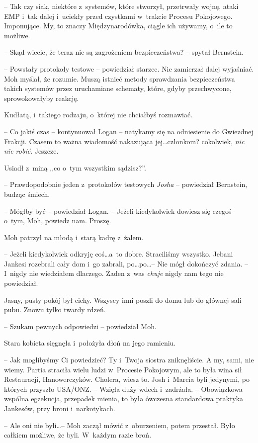 \documentclass[oneside,polish,11pt,sfheadings]{mwbk}
\begin{document}
-- Tak czy siak,
niektóre z~systemów, które stworzył, przetrwały wojnę, ataki EMP i~tak
dalej i~uciekły przed czystkami w~trakcie Procesu Pokojowego.
Imponujące. My, to znaczy Międzynarodówka, ciągle ich używamy, o~ile to
możliwe.

-- Skąd wiecie, że teraz nie są zagrożeniem bezpieczeństwa? -- spytał
Bernstein.

-- Powstały protokoły testowe -- powiedział starzec. Nie zamierzał dalej
wyjaśniać. Moh myślał, że rozumie. Muszą istnieć metody sprawdzania
bezpieczeństwa takich systemów przez uruchamiane schematy, które, gdyby
przechwycone, sprowokowałyby reakcję.

Kudłatą, i~takiego rodzaju, o~której nie chciałbyś rozmawiać.

-- Co jakiś czas -- kontynuował Logan -- natykamy się na odniesienie do
Gwiezdnej Frakcji. Czasem to ważna wiadomość nakazująca jej\ldots członkom?
cokolwiek, \emph{nic nie robić}. Jeszcze.

Usiadł z~miną ,,co o~tym wszystkim sądzisz?''.

-- Prawdopodobnie jeden z~protokołów testowych \emph{Josha} -- powiedział
Bernstein, budząc śmiech.

-- Mógłby być -- powiedział Logan. -- Jeżeli kiedykolwiek dowiesz się
czegoś o~tym, Moh, powiedz nam. Proszę.

Moh patrzył na młodą i~starą kadrę z~żalem. 

-- Jeżeli kiedykolwiek
odkryję coś\ldots a~to dobre. Straciliśmy wszystko. Jebani Jankesi
rozebrali cały dom i~go zabrali, po\ldots po\ldots -- Nie mógł dokończyć
zdania. -- I~nigdy nie wiedziałem dlaczego. Żaden z~was \emph{chuje}
nigdy nam tego nie powiedział.

Jasny, pusty pokój był cichy. Wszyscy inni poszli do domu lub do głównej
sali pubu. Znowu tylko twardy rdzeń.

-- Szukam pewnych odpowiedzi -- powiedział Moh.

Stara kobieta sięgnęła i~położyła dłoń na jego ramieniu. 

-- Jak
moglibyśmy Ci powiedzieć? Ty i~Twoja siostra zniknęliście. A my, sami,
nie wiemy. Partia straciła wielu ludzi w~Procesie Pokojowym, ale to była
wina sił Restauracji, Hanowerczyków. Cholera, wiesz to. Josh i~Marcia
byli jedynymi, po których przyszło USA/ONZ. -- Wzięła duży wdech i~zadrżała. -- Obowiązkowa wspólna egzekucja, przepadek mienia, to była
ówczesna standardowa praktyka Jankesów, przy broni i~narkotykach.

-- Ale oni nie byli\ldots -- Moh zaczął mówić z~oburzeniem, potem przestał.
Było całkiem możliwe, że byli. W~każdym razie broń.
\end{document}
